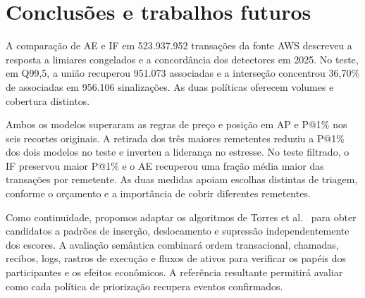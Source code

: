 \section{Conclusões e trabalhos futuros}
\label{sec:conclusoes}
A comparação de AE e IF em 523.937.952 transações da fonte AWS descreveu a resposta a limiares congelados e a concordância dos detectores em 2025. No teste, em Q99,5, a união recuperou 951.073 associadas e a interseção concentrou 36,70\% de associadas em 956.106 sinalizações. As duas políticas oferecem volumes e cobertura distintos.

Ambos os modelos superaram as regras de preço e posição em AP e P@1\% nos seis recortes originais. A retirada dos três maiores remetentes reduziu a P@1\% dos dois modelos no teste e inverteu a liderança no estresse. No teste filtrado, o IF preservou maior P@1\% e o AE recuperou uma fração média maior das transações por remetente. As duas medidas apoiam escolhas distintas de triagem, conforme o orçamento e a importância de cobrir diferentes remetentes.

Como continuidade, propomos adaptar os algoritmos de Torres et al.\ \cite{Torres2021} para obter candidatos a padrões de inserção, deslocamento e supressão independentemente dos escores. A avaliação semântica combinará ordem transacional, chamadas, recibos, logs, rastros de execução e fluxos de ativos para verificar os papéis dos participantes e os efeitos econômicos. A referência resultante permitirá avaliar como cada política de priorização recupera eventos confirmados.
